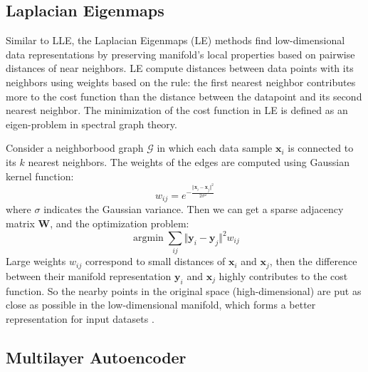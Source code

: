 \documentclass[journal]{IEEEtran}
\DeclareMathOperator*{\argmin}{argmin}
\begin{document}
%
%
\subsection{Laplacian Eigenmaps}
Similar to LLE, the Laplacian Eigenmaps (LE) methods find low-dimensional data representations by preserving manifold's local properties based on pairwise distances of near neighbors.
LE compute distances between data points with its neighbors using weights based on the rule: the first nearest neighbor contributes more to the cost function than the distance between the datapoint and its second nearest neighbor.
The minimization of the cost function in LE is defined as an eigen-problem in spectral graph theory.
 
Consider a neighborbood graph $\mathcal{G}$ in which each data sample $\bm{x}_i$ is connected to its $k$ nearest neighbors.
The weights of the edges are computed using Gaussian kernel function:
\begin{equation}
w_{ij} = e^{-\frac{\Vert \bm{x}_i - \bm{x}_j \Vert^2}{2\sigma^2}}
\end{equation}
where $\sigma$ indicates the Gaussian variance.
Then we can get a sparse adjacency matrix $\bm{W}$, and the optimization problem:
\begin{equation}
\argmin \sum_{ij} \Vert\bm{y}_i - \bm{y}_j \Vert^2 w_{ij}
\end{equation}
Large weights $w_{ij}$ correspond to small distances of $\bm{x}_i$ and $\bm{x}_j$, then the difference between their manifold representation $\bm{y}_i$ and $\bm{x}_j$ highly contributes to the cost function.
So the nearby points in the original space (high-dimensional) are put as close as possible in the low-dimensional manifold, which forms a better representation for input datasets \cite{belkin2003laplacian}.

%
%
\subsection{Multilayer Autoencoder}

\lipsum[1-4]



\end{document}
